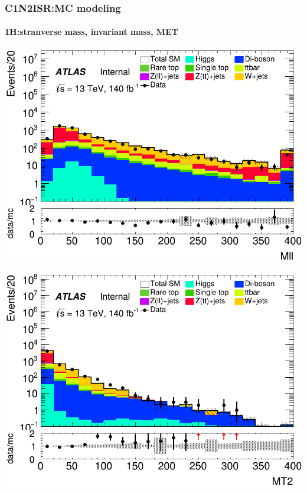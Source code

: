 \documentclass[usenames,dvipsnames]{beamer}
\begin{document}
\begin{frame}
\frametitle{C1N2ISR:MC modeling}
\framesubtitle{1H:\quad stranverse mass, invariant mass, MET}
    \begin{minipage}{0.32\textwidth}
        \centering
        \includegraphics[width=\textwidth]{graphics/H_met/H_met_Mll.png}
    \end{minipage}
    \hfill
    \begin{minipage}{0.32\textwidth}
        \centering
        \includegraphics[width=\textwidth]{graphics/H_met/H_met_MT2.png}
    \end{minipage}
    \hfill
    

\end{frame}
\end{document}
